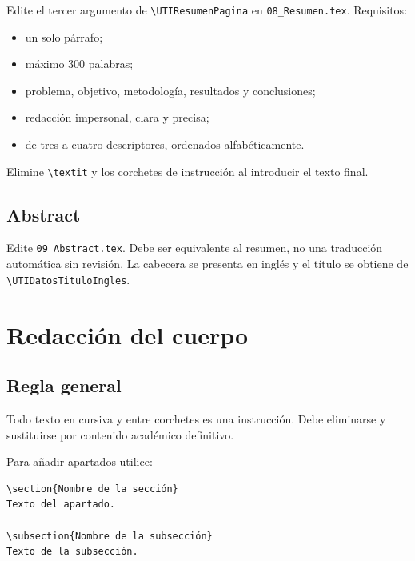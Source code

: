 \documentclass[12pt,a4paper,oneside]{report}
\begin{document}
Edite el tercer argumento de \texttt{\textbackslash UTIResumenPagina} en \texttt{08\_Resumen.tex}. Requisitos:

\begin{itemize}
  \item un solo párrafo;
  \item máximo 300 palabras;
  \item problema, objetivo, metodología, resultados y conclusiones;
  \item redacción impersonal, clara y precisa;
  \item de tres a cuatro descriptores, ordenados alfabéticamente.
\end{itemize}

Elimine \texttt{\textbackslash textit} y los corchetes de instrucción al introducir el texto final.

\section{Abstract}

Edite \texttt{09\_Abstract.tex}. Debe ser equivalente al resumen, no una traducción automática sin revisión. La cabecera se presenta en inglés y el título se obtiene de \texttt{\textbackslash UTIDatosTituloIngles}.

\chapter{Redacción del cuerpo}

\section{Regla general}

Todo texto en cursiva y entre corchetes es una instrucción. Debe eliminarse y sustituirse por contenido académico definitivo.

Para añadir apartados utilice:

\begin{lstlisting}
\section{Nombre de la sección}
Texto del apartado.

\subsection{Nombre de la subsección}
Texto de la subsección.
\end{lstlisting}
\end{document}
